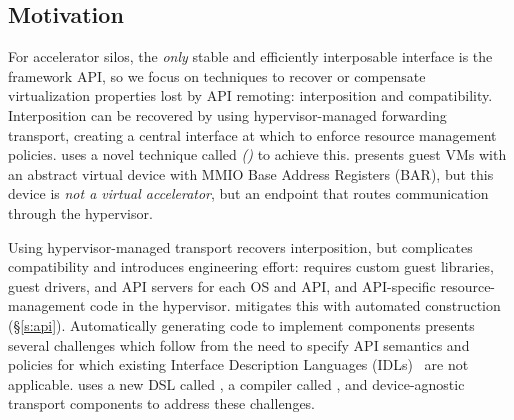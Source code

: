 

\subsection{Motivation}
\label{s:motivation}

For accelerator silos, the \emph{only} stable and
efficiently interposable interface is the framework API, so
we focus on techniques to recover or compensate virtualization properties lost by
API remoting: interposition and compatibility.
Interposition can be recovered by using hypervisor-managed forwarding transport,
creating a central interface at which to enforce resource management policies.
\Model uses a novel technique called \emph{\noveltechnique (\novtechabbrv)} to achieve this.
\novtechabbrv presents guest VMs with an abstract virtual device with MMIO Base Address Registers (BAR), but this device is \emph{not a virtual accelerator}, but an endpoint that
routes communication through the hypervisor.

Using hypervisor-managed transport recovers interposition, but complicates compatibility and introduces engineering effort:
\novtechabbrv requires custom guest libraries, guest drivers, and API servers for each OS and API, and API-specific resource-management code in the hypervisor.
\model mitigates this with automated construction (\S\ref{s:api}).
Automatically generating code to implement \novtechabbrv components presents several challenges which
follow from the need to specify API semantics and policies for which
existing Interface Description Languages (IDLs)~\cite{Lamb1987,MSIDL} are not applicable.
\Model uses a new DSL called \speclang, a compiler called \compiler, and device-agnostic transport components to address these challenges.


